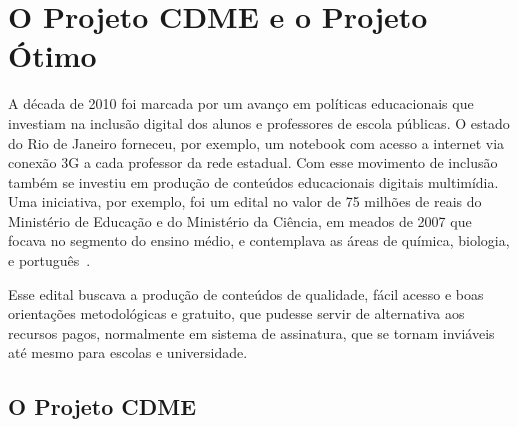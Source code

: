 \chapter{O Projeto CDME e o Projeto Ótimo}
\label{cap:CDME}




A década de 2010 foi marcada por um avanço em políticas educacionais que investiam na inclusão digital dos alunos e professores de escola públicas. O estado do Rio de Janeiro forneceu, por exemplo, um notebook com acesso a internet via conexão 3G a cada professor da rede estadual. Com esse movimento de inclusão também se investiu em produção de conteúdos educacionais digitais multimídia. Uma iniciativa, por exemplo, foi um edital no valor de 75 milhões de reais do Ministério de Educação e do Ministério da Ciência, em meados de 2007 que focava no segmento do ensino médio, e contemplava as áreas de química, biologia, e português~\cite{cdmebortolossi2016conteudos}.

Esse edital buscava a produção de conteúdos de qualidade, fácil acesso e boas orientações metodológicas e gratuito, que pudesse servir de alternativa aos recursos pagos, normalmente em sistema de assinatura, que se tornam inviáveis até mesmo para escolas e universidade.


\section{O Projeto CDME}



